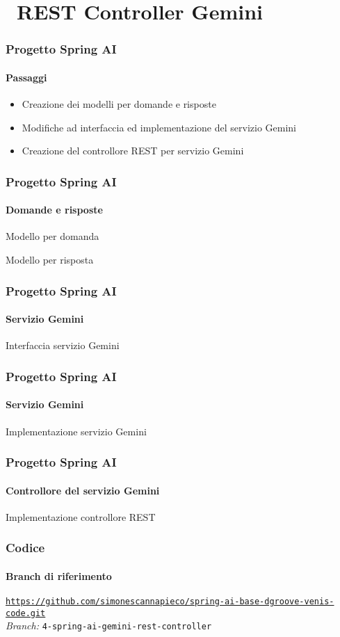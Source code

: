 \section{\faWrench\ REST Controller Gemini} %
\label{sec:spring-ai-gemini-rest-controller}
%
\begin{frame}[t,fragile] \frametitle{Progetto Spring AI}
    \framesubtitle{Passaggi}
	\begin{itemize}
		\item[\alertedcircled{1}] Creazione dei modelli per domande e risposte
        \item[\alertedcircled{2}] Modifiche ad interfaccia ed implementazione del servizio Gemini
        \item[\alertedcircled{3}] Creazione del controllore REST per servizio Gemini
	\end{itemize}        
\end{frame}
%
\begin{frame}[t,fragile] \frametitle{Progetto Spring AI}
    \framesubtitle{Domande e risposte}
        \begin{block}{Modello per domanda}
			{\tiny}
    	\end{block}
        \begin{block}{Modello per risposta}
			{\tiny}
    	\end{block}

\end{frame}
%
\begin{frame}[t,fragile] \frametitle{Progetto Spring AI}
    \framesubtitle{Servizio Gemini}
        \begin{block}{Interfaccia servizio Gemini}
{\tiny}
    \end{block}
\end{frame}
%
\begin{frame}[t,fragile] \frametitle{Progetto Spring AI}
    \framesubtitle{Servizio Gemini}
		\vspace*{-.7cm}
        \begin{block}{Implementazione servizio Gemini}
{\tiny}
    \end{block}
\end{frame}
%
\begin{frame}[t,fragile] \frametitle{Progetto Spring AI}
    \framesubtitle{Controllore del servizio Gemini}
        \begin{block}{Implementazione controllore REST}
			{\tiny}
    	\end{block}
\end{frame}
%
\begin{frame}[fragile] \frametitle{Codice}
    \framesubtitle{Branch di riferimento}
	\begin{center}
		{\scriptsize \href{https://github.com/simonescannapieco/spring-ai-base-dgroove-venis-code.git}{\texttt{https://github.com/simonescannapieco/spring-ai-base-dgroove-venis-code.git}}}\\
		\textit{Branch:} \alert{\texttt{4-spring-ai-gemini-rest-controller}}
	\end{center}
\end{frame}